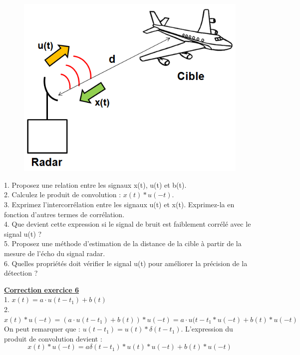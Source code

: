 \documentclass[11pt]{report}
\begin{document}
	\begin{figure}[h!]
		\centering
		\includegraphics[scale=0.5]{images/TD_8_6.png} 
	\end{figure}
	
	1. Proposez une relation entre les signaux x(t), u(t) et b(t).\\
	
	2. Calculez le produit de convolution : $x(t)*u(-t)$.\\
	
	3. Exprimez l'intercorrélation entre les signaux u(t) et x(t). Exprimez-la en fonction d'autres termes de corrélation.\\
	
	4. Que devient cette expression si le signal de bruit est faiblement corrélé avec le signal u(t) ?\\
	
	5. Proposez une méthode d'estimation de la distance de la cible à partir de la mesure de l'écho du signal radar.\\
	
	6. Quelles propriétés doit vérifier le signal u(t) pour améliorer la précision de la détection ?
	
	
	\vspace{1\baselineskip}	
	
	\textbf{\underline{Correction exercice 6}}\\
	
	1. $x(t)=a\cdot u(t-t_{1})+b(t)$\\
	
	2. $x(t)*u(-t)=(a\cdot u(t-t_{1})+b(t))*u(-t)=a\cdot u(t-t_{1}*u(-t)+b(t)*u(-t)$\\
	On peut remarquer que : $u(t-t_{1})=u(t)*\delta(t-t_{1})$. L'expression du produit de convolution devient :
	\begin{equation*}
	x(t)*u(-t)=a\delta(t-t_{1})*u(t)*u(-t)+b(t)*u(-t)
	\end{equation*}
	
\end{document}
